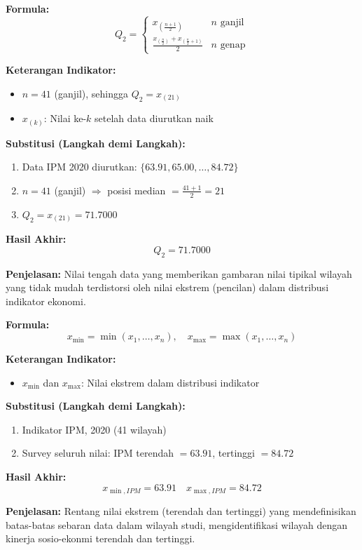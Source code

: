 \documentclass[11pt,a4paper]{article}
\begin{document}
\begin{tcolorbox}[formula_box, title={Median (Kuartil Kedua, $Q_2$)} \label{kotak:median}]
\textbf{Formula:}
\[ Q_2 = \begin{cases} x_{\left(\frac{n+1}{2}\right)} & n \text{ ganjil} \\ \frac{x_{\left(\frac{n}{2}\right)} + x_{\left(\frac{n}{2}+1\right)}}{2} & n \text{ genap} \end{cases} \]

\textbf{Keterangan Indikator:}
\begin{itemize}
  \item $n = 41$ (ganjil), sehingga $Q_2 = x_{(21)}$
  \item $x_{(k)}$: Nilai ke-$k$ setelah data diurutkan naik
\end{itemize}

\textbf{Substitusi (Langkah demi Langkah):}
\begin{enumerate}
  \item Data IPM 2020 diurutkan: $\{63.91, 65.00, \ldots, 84.72\}$
  \item $n = 41$ (ganjil) $\Rightarrow$ posisi median $= \frac{41+1}{2} = 21$
  \item $Q_2 = x_{(21)} = 71.7000$
\end{enumerate}

\textbf{Hasil Akhir:}
\[ Q_2 = 71.7000 \]

\textbf{Penjelasan:} Nilai tengah data yang memberikan gambaran nilai tipikal wilayah yang tidak mudah terdistorsi oleh nilai ekstrem (pencilan) dalam distribusi indikator ekonomi.
\end{tcolorbox}

\begin{tcolorbox}[formula_box, title={Nilai Minimum dan Maksimum}] \label{kotak:minmax}
\textbf{Formula:}
\[ x_{\min} = \min(x_1,\ldots,x_n),\quad x_{\max} = \max(x_1,\ldots,x_n) \]

\textbf{Keterangan Indikator:}
\begin{itemize}
  \item $x_{\min}$ dan $x_{\max}$: Nilai ekstrem dalam distribusi indikator
\end{itemize}

\textbf{Substitusi (Langkah demi Langkah):}
\begin{enumerate}
  \item Indikator IPM, 2020 (41 wilayah)
  \item Survey seluruh nilai: IPM terendah $= 63.91$, tertinggi $= 84.72$
\end{enumerate}

\textbf{Hasil Akhir:}
\[ x_{\min,IPM} = 63.91 \quad x_{\max,IPM} = 84.72 \]

\textbf{Penjelasan:} Rentang nilai ekstrem (terendah dan tertinggi) yang mendefinisikan batas-batas sebaran data dalam wilayah studi, mengidentifikasi wilayah dengan kinerja sosio-ekonmi terendah dan tertinggi.
\end{tcolorbox}
\end{document}

